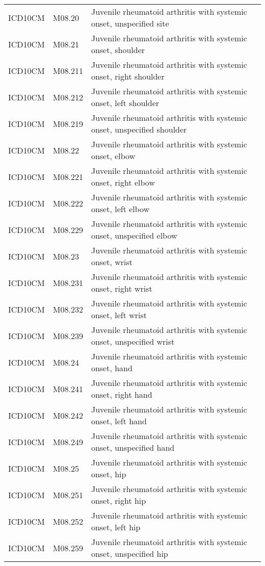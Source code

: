 \begin{longtable}{p{}p{}p{}}
  ICD10CM & M08.20 & Juvenile rheumatoid arthritis with systemic onset, unspecified site \\ 
  ICD10CM & M08.21 & Juvenile rheumatoid arthritis with systemic onset, shoulder \\ 
  ICD10CM & M08.211 & Juvenile rheumatoid arthritis with systemic onset, right shoulder \\ 
  ICD10CM & M08.212 & Juvenile rheumatoid arthritis with systemic onset, left shoulder \\ 
  ICD10CM & M08.219 & Juvenile rheumatoid arthritis with systemic onset, unspecified shoulder \\ 
  ICD10CM & M08.22 & Juvenile rheumatoid arthritis with systemic onset, elbow \\ 
  ICD10CM & M08.221 & Juvenile rheumatoid arthritis with systemic onset, right elbow \\ 
  ICD10CM & M08.222 & Juvenile rheumatoid arthritis with systemic onset, left elbow \\ 
  ICD10CM & M08.229 & Juvenile rheumatoid arthritis with systemic onset, unspecified elbow \\ 
  ICD10CM & M08.23 & Juvenile rheumatoid arthritis with systemic onset, wrist \\ 
  ICD10CM & M08.231 & Juvenile rheumatoid arthritis with systemic onset, right wrist \\ 
  ICD10CM & M08.232 & Juvenile rheumatoid arthritis with systemic onset, left wrist \\ 
  ICD10CM & M08.239 & Juvenile rheumatoid arthritis with systemic onset, unspecified wrist \\ 
  ICD10CM & M08.24 & Juvenile rheumatoid arthritis with systemic onset, hand \\ 
  ICD10CM & M08.241 & Juvenile rheumatoid arthritis with systemic onset, right hand \\ 
  ICD10CM & M08.242 & Juvenile rheumatoid arthritis with systemic onset, left hand \\ 
  ICD10CM & M08.249 & Juvenile rheumatoid arthritis with systemic onset, unspecified hand \\ 
  ICD10CM & M08.25 & Juvenile rheumatoid arthritis with systemic onset, hip \\ 
  ICD10CM & M08.251 & Juvenile rheumatoid arthritis with systemic onset, right hip \\ 
  ICD10CM & M08.252 & Juvenile rheumatoid arthritis with systemic onset, left hip \\ 
  ICD10CM & M08.259 & Juvenile rheumatoid arthritis with systemic onset, unspecified hip \\ 

\end{longtable}
